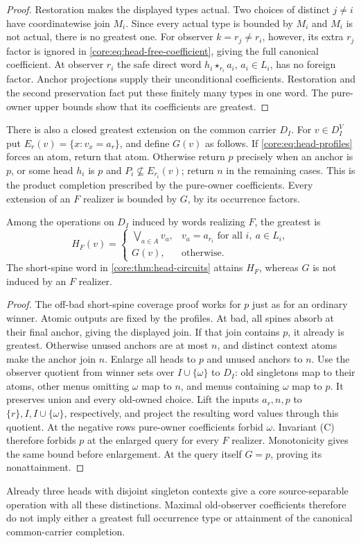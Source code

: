 \begin{proof}
Restoration makes the displayed types actual. Two choices of distinct
$j\ne i$ have coordinatewise join $M_i$. Since every actual type is
bounded by $M_i$ and $M_i$ is not actual, there is no greatest one.
For observer $k=r_j\ne r_i$, however, its extra $r_j$ factor is
ignored in \eqref{core:eq:head-free-coefficient}, giving the full
canonical coefficient. At observer $r_i$ the safe direct word
$h_i\star_{r_i}a_i$, $a_i\in L_i$, has no foreign factor. Anchor
projections supply their unconditional coefficients. Restoration and
the second preservation fact put these finitely many types in one
word. The pure-owner upper bounds show that its coefficients are greatest.
\end{proof}

There is also a closed greatest extension on the common carrier $D_I$.
For $v\in D_I^V$ put $E_r(v)=\{x:v_x=a_r\}$, and define $G(v)$ as
follows. If \eqref{core:eq:head-profiles} forces an atom, return that
atom. Otherwise return $p$ precisely when an anchor is $p$, or some
head $h_i$ is $p$ and $P_i\nsubseteq E_{r_i}(v)$; return $n$ in the
remaining cases. This is the product completion prescribed by the
pure-owner coefficients. Every extension of an $F$ realizer is bounded
by $G$, by its occurrence factors.

\begin{corollary}
\label{core:thm:head-completions}
Among the operations on $D_I$ induced by words realizing $F$, the
greatest is
\[
 H_F(v)=\begin{cases}
          \displaystyle\bigvee_{a\in A}v_a,
             &v_a=a_{r_i}\text{ for all }i,\ a\in L_i,\\
          G(v),&\text{otherwise}.
        \end{cases}
\]
The short-spine word in \cref{core:thm:head-circuits} attains $H_F$,
whereas $G$ is not induced by an $F$ realizer.
\end{corollary}
\begin{proof}
The off-bad short-spine coverage proof works for $p$ just as for an
ordinary winner. Atomic outputs are fixed by the profiles. At bad, all
spines absorb at their final anchor, giving the displayed join.
If that join contains $p$, it already is greatest. Otherwise unused
anchors are at most $n$, and distinct context atoms make the anchor
join $n$. Enlarge all heads to $p$ and unused anchors to $n$.
Use the observer quotient from winner sets over $I\cup\{\omega\}$
to $D_I$: old singletons map to their atoms, other menus omitting
$\omega$ map to $n$, and menus containing $\omega$ map to $p$.
It preserves union and every old-owned choice. Lift the inputs
$a_r,n,p$ to $\{r\},I,I\cup\{\omega\}$, respectively, and project
the resulting word values through this quotient.
At the negative rows pure-owner coefficients forbid $\omega$.
Invariant (C) therefore forbids $p$ at the enlarged query for every
$F$ realizer. Monotonicity gives the same bound before enlargement.
At the query itself $G=p$, proving its nonattainment.
\end{proof}

Already three heads with disjoint singleton contexts give a core
source-separable operation with all these distinctions. Maximal
old-observer coefficients therefore do not imply either a greatest
full occurrence type or attainment of the canonical common-carrier
completion.
